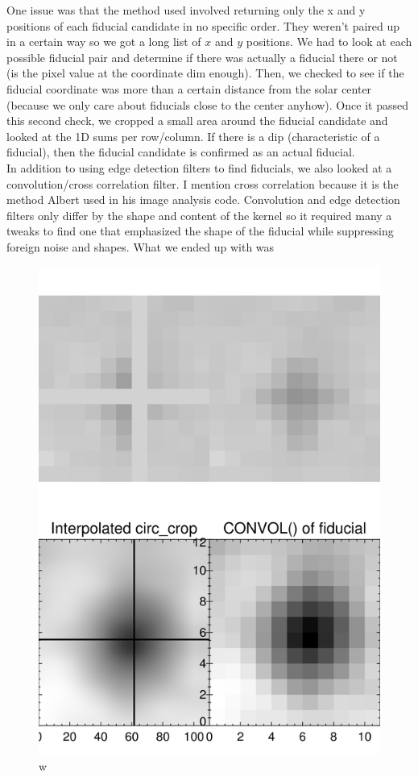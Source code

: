 \documentclass[10pt]{scrartcl}
\begin{document}
One issue was that the method used involved returning only the x and y positions of each fiducial candidate in no specific order. They weren't paired up in a certain way so we got a long list of $x$ and $y$ positions. We had to look at each possible fiducial pair and determine if there was actually a fiducial there or not (is the pixel value at the coordinate dim enough). Then, we checked to see if the fiducial coordinate was more than a certain distance from the solar center (because we only care about fiducials close to the center anyhow). Once it passed this second check, we cropped a small area around the fiducial candidate and looked at the 1D sums per row/column. If there is a dip (characteristic of a fiducial), then the fiducial candidate is confirmed as an actual fiducial.\\

In addition to using edge detection filters to find fiducials, we also looked at a convolution/cross correlation filter. I mention cross correlation because it is the method Albert used in his image analysis code. Convolution and edge detection filters only differ by the shape and content of the kernel so it required many a tweaks to find one that emphasized the shape of the fiducial while suppressing foreign noise and shapes. What we ended up with was 

\begin{figure}[!ht]
   \includegraphics[width=.75\textwidth]{../plots_tables_images/cropcomp3.png}%
   \caption{w}\label{cropcomp}
\end{figure}
\end{document}
